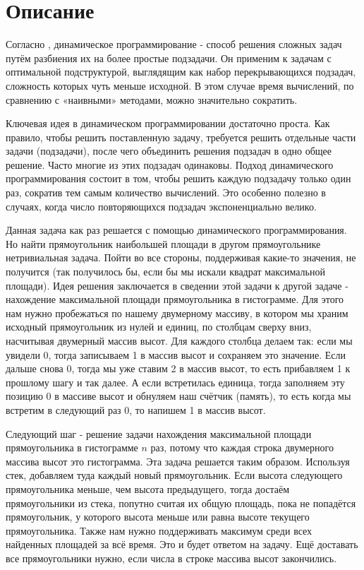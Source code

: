 \section{Описание}

Согласно \cite{dp}, динамическое программирование - способ решения сложных задач путём разбиения их на более простые подзадачи. Он применим к задачам с оптимальной подструктурой, выглядящим как набор перекрывающихся подзадач, сложность которых чуть меньше исходной. В этом случае время вычислений, по сравнению с «наивными» методами, можно значительно сократить.

Ключевая идея в динамическом программировании достаточно проста. Как правило, чтобы решить поставленную задачу, требуется решить отдельные части задачи (подзадачи), после чего объединить решения подзадач в одно общее решение. Часто многие из этих подзадач одинаковы. Подход динамического программирования состоит в том, чтобы решить каждую подзадачу только один раз, сократив тем самым количество вычислений. Это особенно полезно в случаях, когда число повторяющихся подзадач экспоненциально велико.

Данная задача как раз решается с помощью динамического программирования. Но найти прямоугольник наибольшей площади в другом прямоугольнике нетривиальная задача. Пойти во все стороны, поддерживая какие-то значения, не получится (так получилось бы, если бы мы искали квадрат максимальной площади). Идея решения заключается в сведении этой задачи к другой задаче - нахождение максимальной площади прямоугольника в гистограмме. Для этого нам нужно пробежаться по нашему двумерному массиву, в котором мы храним исходный прямоугольник из нулей и единиц, по столбцам сверху вниз, насчитывая двумерный массив высот. Для каждого столбца делаем так: если мы увидели 0, тогда записываем 1 в массив высот и сохраняем это значение. Если дальше снова 0, тогда мы уже ставим 2 в массив высот, то есть прибавляем 1 к прошлому шагу и так далее. А если встретилась единица, тогда заполняем эту позицию 0 в массиве высот и обнуляем наш счётчик (память), то есть когда мы встретим в следующий раз 0, то напишем 1 в массив высот. 

Следующий шаг - решение задачи нахождения максимальной площади прямоугольника в гистограмме $n$ раз, потому что каждая строка двумерного массива высот это гистограмма. Эта задача решается таким образом. Используя стек, добавляем туда каждый новый прямоугольник. Если высота следующего прямоугольника меньше, чем высота предыдущего, тогда достаём прямоугольники из стека, попутно считая их общую площадь, пока не попадётся прямоугольник, у которого высота меньше или равна высоте текущего прямоугольника. Также нам нужно поддерживать максимум среди всех найденных площадей за всё время. Это и будет ответом на задачу. Ещё доставать все прямоугольники нужно, если числа в строке массива высот закончились.

